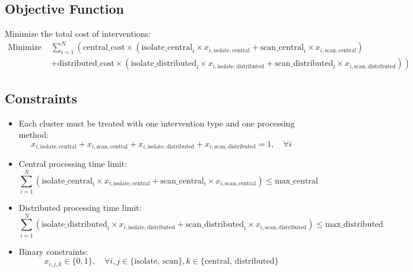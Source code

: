 \documentclass{article}
\begin{document}
\subsection*{Objective Function}
Minimize the total cost of interventions:
\[
\begin{align*}
\text{Minimize } & \sum_{i=1}^{N} \left( \text{central\_cost} \times (\text{isolate\_central}_i \times x_{i, \text{isolate}, \text{central}} + \text{scan\_central}_i \times x_{i, \text{scan}, \text{central}}) \right. \\
& \left. + \text{distributed\_cost} \times (\text{isolate\_distributed}_i \times x_{i, \text{isolate}, \text{distributed}} + \text{scan\_distributed}_i \times x_{i, \text{scan}, \text{distributed}}) \right)
\end{align*}
\]

\subsection*{Constraints}
\begin{itemize}
    \item Each cluster must be treated with one intervention type and one processing method:
    \[
    x_{i, \text{isolate}, \text{central}} + x_{i, \text{scan}, \text{central}} + x_{i, \text{isolate}, \text{distributed}} + x_{i, \text{scan}, \text{distributed}} = 1, \quad \forall i
    \]

    \item Central processing time limit:
    \[
    \sum_{i=1}^{N} (\text{isolate\_central}_i \times x_{i, \text{isolate}, \text{central}} + \text{scan\_central}_i \times x_{i, \text{scan}, \text{central}}) \leq \text{max\_central}
    \]

    \item Distributed processing time limit:
    \[
    \sum_{i=1}^{N} (\text{isolate\_distributed}_i \times x_{i, \text{isolate}, \text{distributed}} + \text{scan\_distributed}_i \times x_{i, \text{scan}, \text{distributed}}) \leq \text{max\_distributed}
    \]

    \item Binary constraints:
    \[
    x_{i, j, k} \in \{0, 1\}, \quad \forall i, j \in \{\text{isolate, scan}\}, k \in \{\text{central, distributed}\}
    \]
\end{itemize}
\end{document}
